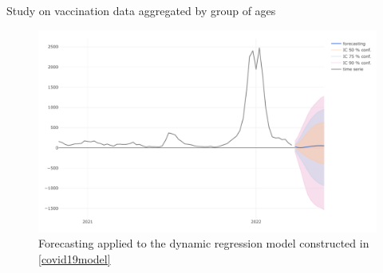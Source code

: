 \documentclass[10pt]{beamer}
\begin{document}
\begin{frame}{Study on vaccination data aggregated by group of ages}


    \begin{figure}\small
        \caption{Forecasting applied to the dynamic regression model constructed in \ref*{covid19model}}
        \includegraphics[scale=0.4]{covid19-forecasting.pdf}
    \end{figure}
\end{frame}


\begin{frame}
    
    
\end{frame}
\end{document}
